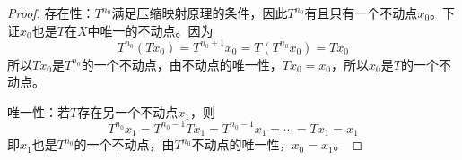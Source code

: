 \begin{proof}
	存在性：$T^{n_0}$满足压缩映射原理的条件，因此$T^{n_0}$有且只有一个不动点$x_0$。下证$x_0$也是$T$在$X$中唯一的不动点。因为
	\begin{equation*}
		T^{n_0}(Tx_0)=T^{n_0+1}x_0=T(T^{n_0}x_0)=Tx_0
	\end{equation*}
	所以$Tx_0$是$T^{n_0}$的一个不动点，由不动点的唯一性，$Tx_0=x_0$，所以$x_0$是$T$的一个不动点。\par
	唯一性：若$T$存在另一个不动点$x_1$，则
	\begin{equation*}
		T^{n_0}x_1=T^{n_0-1}Tx_1=T^{n_0-1}x_1=\cdots=Tx_1=x_1
	\end{equation*}
	即$x_1$也是$T^{n_0}$的一个不动点，由$T^{n_0}$不动点的唯一性，$x_0=x_1$。
\end{proof}
